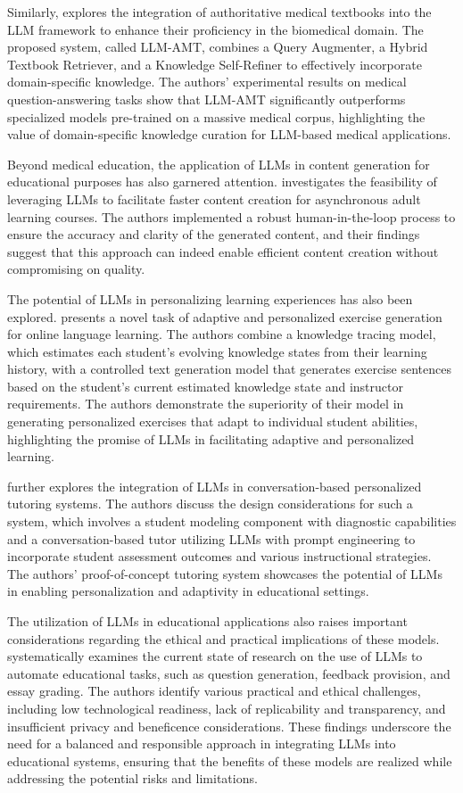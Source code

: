 \documentclass[11pt]{article}
\begin{document}
Similarly, \cite{ref220} explores the integration of authoritative medical textbooks into the LLM framework to enhance their proficiency in the biomedical domain. The proposed system, called LLM-AMT, combines a Query Augmenter, a Hybrid Textbook Retriever, and a Knowledge Self-Refiner to effectively incorporate domain-specific knowledge. The authors' experimental results on medical question-answering tasks show that LLM-AMT significantly outperforms specialized models pre-trained on a massive medical corpus, highlighting the value of domain-specific knowledge curation for LLM-based medical applications.

Beyond medical education, the application of LLMs in content generation for educational purposes has also garnered attention. \cite{ref221} investigates the feasibility of leveraging LLMs to facilitate faster content creation for asynchronous adult learning courses. The authors implemented a robust human-in-the-loop process to ensure the accuracy and clarity of the generated content, and their findings suggest that this approach can indeed enable efficient content creation without compromising on quality.

The potential of LLMs in personalizing learning experiences has also been explored. \cite{ref222} presents a novel task of adaptive and personalized exercise generation for online language learning. The authors combine a knowledge tracing model, which estimates each student's evolving knowledge states from their learning history, with a controlled text generation model that generates exercise sentences based on the student's current estimated knowledge state and instructor requirements. The authors demonstrate the superiority of their model in generating personalized exercises that adapt to individual student abilities, highlighting the promise of LLMs in facilitating adaptive and personalized learning.

\cite{ref223} further explores the integration of LLMs in conversation-based personalized tutoring systems. The authors discuss the design considerations for such a system, which involves a student modeling component with diagnostic capabilities and a conversation-based tutor utilizing LLMs with prompt engineering to incorporate student assessment outcomes and various instructional strategies. The authors' proof-of-concept tutoring system showcases the potential of LLMs in enabling personalization and adaptivity in educational settings.

The utilization of LLMs in educational applications also raises important considerations regarding the ethical and practical implications of these models. \cite{ref224} systematically examines the current state of research on the use of LLMs to automate educational tasks, such as question generation, feedback provision, and essay grading. The authors identify various practical and ethical challenges, including low technological readiness, lack of replicability and transparency, and insufficient privacy and beneficence considerations. These findings underscore the need for a balanced and responsible approach in integrating LLMs into educational systems, ensuring that the benefits of these models are realized while addressing the potential risks and limitations.
\end{document}
